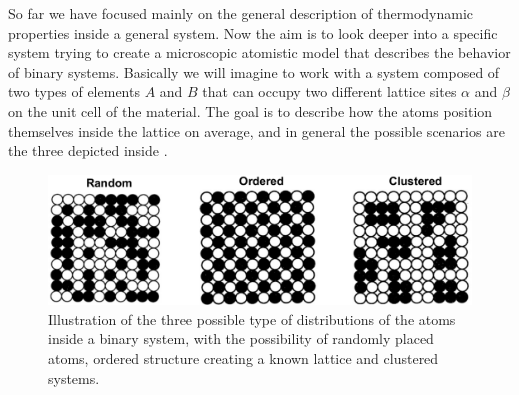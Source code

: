 So far we have focused mainly on the general description of thermodynamic properties inside a general system. Now the aim is to look deeper into a specific system trying to create a microscopic atomistic model that describes the behavior of binary systems. Basically we will imagine to work with a system composed of two types of elements $A$ and $B$ that can occupy two different lattice sites $\alpha$ and $\beta$ on the unit cell of the material. The goal is to describe how the atoms position themselves inside the lattice on average, and in general the possible scenarios are the three depicted inside .
\begin{figure}[t]
    \centering
    \includegraphics[width=\linewidth]{Immagini/SistemiBiatomici.png}
    \caption{
        Illustration of the three possible type of distributions of the atoms inside a binary system, with the possibility of randomly placed atoms, ordered structure creating a known lattice and clustered systems.
    }
    \label{fig:SistemiBiatomici}
\end{figure}

